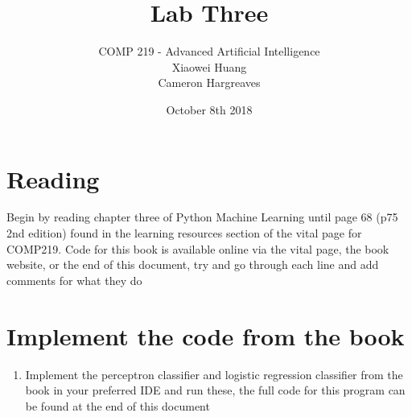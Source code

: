 \documentclass[12pt]{article}
\begin{document}


\date{October 8th 2018}
 
 
\title{Lab Three}%
\author{COMP 219 - Advanced Artificial Intelligence \\
		Xiaowei Huang \\ 
		Cameron Hargreaves\\}
 
\maketitle

\section{Reading}
Begin by reading chapter three of Python Machine Learning until page 68 (p75 2nd edition) found in the learning resources section of the vital page for COMP219. Code for this book is available online via the vital page, the book website, or the end of this document, try and go through each line and add comments for what they do

\section{Implement the code from the book}
\begin{enumerate}
\item Implement the perceptron classifier and logistic regression classifier from the book in your preferred IDE and run these, the full code for this program can be found at the end of this document 
\end{enumerate}
\end{document}
